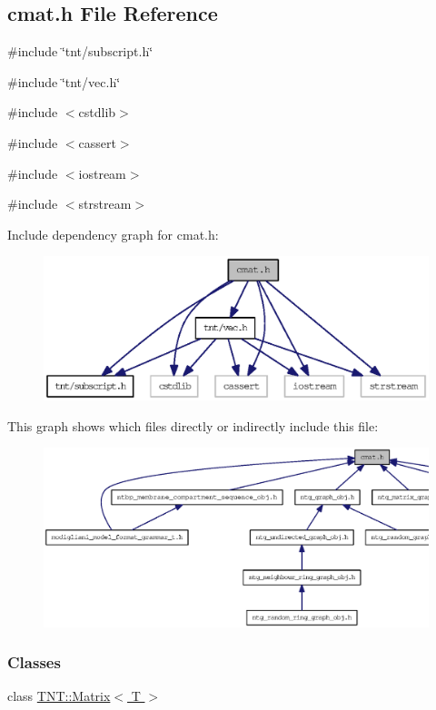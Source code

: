 \subsection{cmat.h File Reference}
\label{cmat_8h}
{\ttfamily \#include \char`\"{}tnt/subscript.h\char`\"{}}\par
{\ttfamily \#include \char`\"{}tnt/vec.h\char`\"{}}\par
{\ttfamily \#include $<$cstdlib$>$}\par
{\ttfamily \#include $<$cassert$>$}\par
{\ttfamily \#include $<$iostream$>$}\par
{\ttfamily \#include $<$strstream$>$}\par
Include dependency graph for cmat.h:
\nopagebreak
\begin{figure}[H]
\begin{center}
\leavevmode
\includegraphics[width=400pt]{cmat_8h__incl}
\end{center}
\end{figure}
This graph shows which files directly or indirectly include this file:
\nopagebreak
\begin{figure}[H]
\begin{center}
\leavevmode
\includegraphics[width=400pt]{cmat_8h__dep__incl}
\end{center}
\end{figure}
\subsubsection*{Classes}
\begin{DoxyCompactItemize}
\item 
class \hyperlink{class_t_n_t_1_1_matrix}{TNT::Matrix$<$ T $>$}
\end{DoxyCompactItemize}

